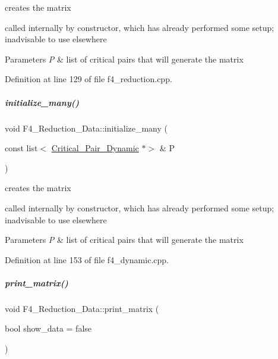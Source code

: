 creates the matrix 

called internally by constructor, which has already performed some setup; inadvisable to use elsewhere 
\begin{DoxyParams}{Parameters}
{\em P} & list of critical pairs that will generate the matrix \\
\hline
\end{DoxyParams}


Definition at line 129 of file f4\+\_\+reduction.\+cpp.

\mbox{\label{group___g_b_computation_a9fa6a212375b9498ca86a2c18e94ca1e}} 
\subparagraph{\texorpdfstring{initialize\+\_\+many()}{initialize\_many()}\hspace{0.1cm}{\footnotesize\ttfamily [2/2]}}
{\footnotesize\ttfamily void F4\+\_\+\+Reduction\+\_\+\+Data\+::initialize\+\_\+many (\begin{DoxyParamCaption}\item[{const list$<$ \hyperlink{group___g_b_computation_class_critical___pair___dynamic}{Critical\+\_\+\+Pair\+\_\+\+Dynamic} $\ast$$>$ \&}]{P }\end{DoxyParamCaption})}



creates the matrix 

called internally by constructor, which has already performed some setup; inadvisable to use elsewhere 
\begin{DoxyParams}{Parameters}
{\em P} & list of critical pairs that will generate the matrix \\
\hline
\end{DoxyParams}


Definition at line 153 of file f4\+\_\+dynamic.\+cpp.

\mbox{\label{group___g_b_computation_a9f3e9b5617084c34f97acd23d6e67a43}} 
\subparagraph{\texorpdfstring{print\+\_\+matrix()}{print\_matrix()}\hspace{0.1cm}{\footnotesize\ttfamily [1/2]}}
{\footnotesize\ttfamily void F4\+\_\+\+Reduction\+\_\+\+Data\+::print\+\_\+matrix (\begin{DoxyParamCaption}\item[{bool}]{show\+\_\+data = {\ttfamily false} }\end{DoxyParamCaption})}




